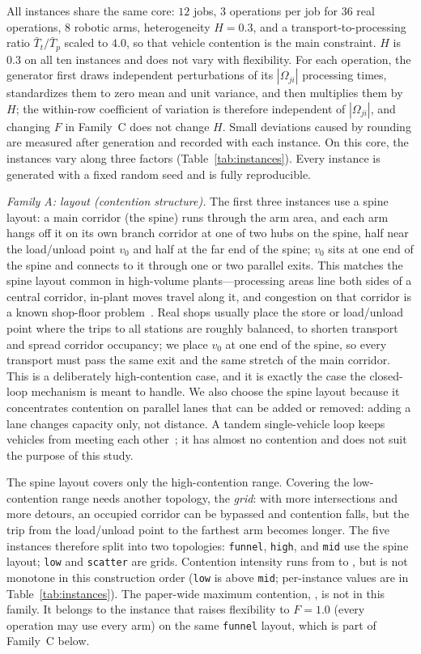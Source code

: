All instances share the same core: $12$ jobs, $3$ operations per job for $36$ real operations, $8$ robotic arms,
heterogeneity $H=0.3$, and a transport-to-processing ratio $\bar{T}_t/\bar{T}_p$ scaled to $4.0$, so that vehicle contention is the main constraint.
$H$ is $0.3$ on all ten instances and does not vary with flexibility.
For each operation, the generator first draws independent perturbations of its $|\Omega_{ji}|$ processing times, standardizes them to zero mean and unit variance, and then multiplies them by $H$; the within-row coefficient of variation is therefore independent of $|\Omega_{ji}|$, and changing $F$ in Family~C does not change $H$.
Small deviations caused by rounding are measured after generation and recorded with each instance.
On this core, the instances vary along three factors (Table~\ref{tab:instances}).
Every instance is generated with a fixed random seed and is fully reproducible.

\emph{Family A: layout (contention structure).}
The first three instances use a spine layout: a main corridor (the spine) runs through the arm area, and each arm hangs off it on its own branch corridor at one of two hubs on the spine, half near the load/unload point $v_0$ and half at the far end of the spine; $v_0$ sits at one end of the spine and connects to it through one or two parallel exits.
This matches the spine layout common in high-volume plants---processing areas line both sides of a central corridor, in-plant moves travel along it, and congestion on that corridor is a known shop-floor problem~\cite{suh2022spine}.
Real shops usually place the store or load/unload point where the trips to all stations are roughly balanced, to shorten transport and spread corridor occupancy; we place $v_0$ at one end of the spine, so every transport must pass the same exit and the same stretch of the main corridor. This is a deliberately high-contention case, and it is exactly the case the closed-loop mechanism is meant to handle.
We also choose the spine layout because it concentrates contention on parallel lanes that can be added or removed: adding a lane changes capacity only, not distance. A tandem single-vehicle loop keeps vehicles from meeting each other~\cite{rahimikelarijani2020tandem}; it has almost no contention and does not suit the purpose of this study.

The spine layout covers only the high-contention range. Covering the low-contention range needs another topology, the \emph{grid}: with more intersections and more detours, an occupied corridor can be bypassed and contention falls, but the trip from the load/unload point to the farthest arm becomes longer.
The five instances therefore split into two topologies: \texttt{funnel}, \texttt{high}, and \texttt{mid} use the spine layout; \texttt{low} and \texttt{scatter} are grids.
Contention intensity runs from \ContentionAHi{} to \ContentionLo{}, but is not monotone in this construction order (\texttt{low} is above \texttt{mid}; per-instance values are in Table~\ref{tab:instances}).
The paper-wide maximum contention, \ContentionHi{}, is not in this family. It belongs to the instance that raises flexibility to $F=1.0$ (every operation may use every arm) on the same \texttt{funnel} layout, which is part of Family~C below.

